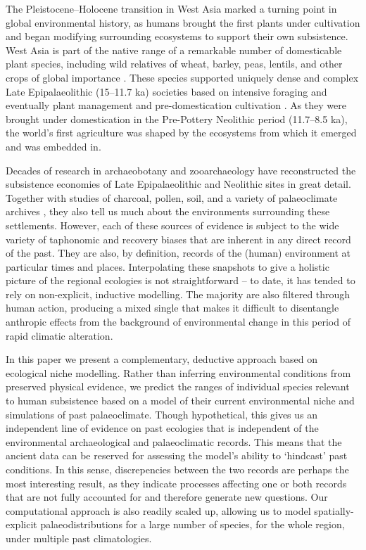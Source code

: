 \documentclass[
  authoryear,
  preprint]{elsarticle}
\begin{document}
The Pleistocene--Holocene transition in West Asia marked a turning point
in global environmental history, as humans brought the first plants
under cultivation and began modifying surrounding ecosystems to support
their own subsistence. West Asia is part of the native range of a
remarkable number of domesticable plant species, including wild
relatives of wheat, barley, peas, lentils, and other crops of global
importance \citep{Diamond2002}. These species supported uniquely dense
and complex Late Epipalaeolithic (15--11.7 ka) societies based on
intensive foraging \citep{BarYosef1998, MaherEtAl2012} and eventually
plant management and pre-domestication cultivation \citep{Harris2007}.
As they were brought under domestication in the Pre-Pottery Neolithic
period (11.7--8.5 ka), the world's first agriculture was shaped by the
ecosystems from which it emerged and was embedded in.

Decades of research in archaeobotany and zooarchaeology have
reconstructed the subsistence economies of Late Epipalaeolithic and
Neolithic sites in great detail. Together with studies of charcoal,
pollen, soil, and a variety of palaeoclimate archives
\citep{JonesEtAl2019}, they also tell us much about the environments
surrounding these settlements. However, each of these sources of
evidence is subject to the wide variety of taphonomic and recovery
biases that are inherent in any direct record of the past. They are
also, by definition, records of the (human) environment at particular
times and places. Interpolating these snapshots to give a holistic
picture of the regional ecologies is not straightforward -- to date, it
has tended to rely on non-explicit, inductive modelling. The majority
are also filtered through human action, producing a mixed single that
makes it difficult to disentangle anthropic effects from the background
of environmental change in this period of rapid climatic alteration.

In this paper we present a complementary, deductive approach based on
ecological niche modelling. Rather than inferring environmental
conditions from preserved physical evidence, we predict the ranges of
individual species relevant to human subsistence based on a model of
their current environmental niche and simulations of past palaeoclimate.
Though hypothetical, this gives us an independent line of evidence on
past ecologies that is independent of the environmental archaeological
and palaeoclimatic records. This means that the ancient data can be
reserved for assessing the model's ability to `hindcast' past
conditions. In this sense, discrepencies between the two records are
perhaps the most interesting result, as they indicate processes
affecting one or both records that are not fully accounted for and
therefore generate new questions. Our computational approach is also
readily scaled up, allowing us to model spatially-explicit
palaeodistributions for a large number of species, for the whole region,
under multiple past climatologies.
\end{document}
